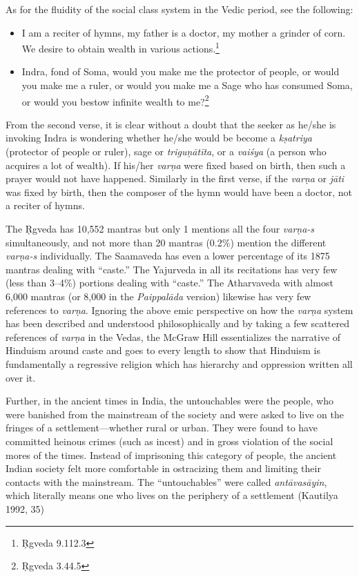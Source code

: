 As for the fluidity of the social class system in the Vedic period, see the following:

\begin{itemize} 
\item I am a reciter of hymns, my father is a doctor, my mother a grinder of corn. We desire to obtain wealth in various actions.\footnote{Ṛgveda 9.112.3}
\item Indra, fond of Soma, would you make me the protector of people, or would you make me a ruler, or would you make me a Sage who has consumed Soma, or would you bestow infinite wealth to me?\footnote{Ṛgveda 3.44.5} 
\end{itemize}

From the second verse, it is clear without a doubt that the seeker as he/she is invoking Indra is wondering whether he/she would be become a \textit{kṣatriya} (protector of people or ruler), sage or \textit{triguṇātīta},  or a \textit{vaiśya} (a person who acquires a lot of wealth). If his/her \textit{varṇa} were fixed based on birth, then such a prayer would not have happened. Similarly in the first verse, if the \textit{varṇa} or \textit{jāti} was fixed by birth, then the composer of the hymn would have been a doctor, not a reciter of hymns. 

The Ṛgveda has 10,552 mantras but only 1 mentions all the four \textit{varṇa-s} simultaneously, and not more than 20 mantras (0.2\%) mention the different \textit{varṇa-s} individually. The Saamaveda has even a lower percentage of its 1875 mantras dealing with “caste.” The Yajurveda in all its recitations has very few (less than 3--4\%) portions dealing with “caste.” The Atharvaveda with almost 6,000 mantras (or 8,000 in the \textit{Paippalāda} version) likewise has very few references to \textit{varṇa}. Ignoring the above emic perspective on how the \textit{varṇa} system has been described and understood philosophically and by taking a few scattered references of \textit{varṇa} in the Vedas, the McGraw Hill essentializes the narrative of Hinduism around caste and goes to every length to show that Hinduism is fundamentally a regressive religion which has hierarchy and oppression written all over it. 

Further, in the ancient times in India, the untouchables were the people, who were banished from the mainstream of the society and were asked to live on the fringes of a settlement—whether rural or urban. They were found to have committed heinous crimes (such as incest) and in gross violation of the social mores of the times. Instead of imprisoning this category of people, the ancient Indian society felt more comfortable in ostracizing them and limiting their contacts with the mainstream. The “untouchables” were called \textit{antāvasāyin},  which literally means one who lives on the periphery of a settlement (Kautilya 1992, 35)

